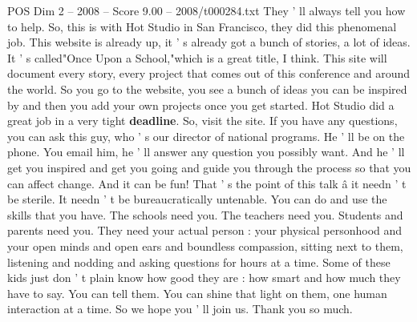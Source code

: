 \begin{textsample}{POS Dim 2 – 2008 – Score 9.00 – 2008/t000284.txt}
They ' ll always tell you how to help.
So, this is with Hot Studio in San Francisco, they did this phenomenal job.
This website is already up, it ' s already got a bunch of stories, a lot of ideas.
It ' s called"Once Upon a School,"which is a great title, I think.
This site will document every story, every project that comes out of this conference and around the world.
So you go to the website, you see a bunch of ideas you can be inspired by and then you add your own projects once you get started.
Hot Studio did a great job in a very tight \textbf{deadline}.
So, visit the site.
If you have any questions, you can ask this guy, who ' s our director of national programs.
He ' ll be on the phone.
You email him, he ' ll answer any question you possibly want.
And he ' ll get you inspired and get you going and guide you through the process so that you can affect change.
And it can be fun!
That ' s the point of this talk â it needn ' t be sterile.
It needn ' t be bureaucratically untenable.
You can do and use the skills that you have.
The schools need you.
The teachers need you.
Students and parents need you.
They need your actual person : your physical personhood and your open minds and open ears and boundless compassion, sitting next to them, listening and nodding and asking questions for hours at a time.
Some of these kids just don ' t plain know how good they are : how smart and how much they have to say.
You can tell them.
You can shine that light on them, one human interaction at a time.
So we hope you ' ll join us.
Thank you so much.

\end{textsample}
